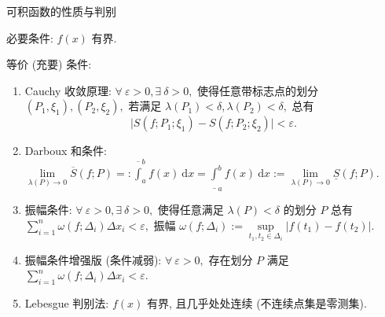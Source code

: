 \begin{frame}{可积函数的性质与判别}

必要条件: $f(x)$ 有界.

\pause
\vspace{1em}

等价 (充要) 条件:
\pause
\begin{enumerate}[<+->]
\item Cauchy 收敛原理: $\forall ~ \varepsilon > 0, \exists ~ \delta > 0,$ 使得任意带标志点的划分 $(P_1, \xi_1), (P_2, \xi_2),$ 若满足 $\lambda(P_1) < \delta, \lambda(P_2) < \delta,$ 总有
\[\lvert S(f; P_1; \xi_1) - S(f; P_2; \xi_2) \rvert < \varepsilon.\]
\item Darboux 和条件: $\lim\limits_{\lambda(P) \to 0} \overline{S}(f; P) =: \overline{\int}_a^b f(x) ~ \mathrm{d} x = \underline{\int}_a^b f(x) ~ \mathrm{d} x := \lim\limits_{\lambda(P) \to 0} \underline{S}(f; P).$
\item 振幅条件: $\forall ~ \varepsilon > 0, \exists ~ \delta > 0,$ 使得任意满足 $\lambda(P) < \delta$ 的划分 $P$ 总有
$\sum\limits_{i=1}^n \omega(f; \Delta_i) \Delta x_i < \varepsilon,$ 振幅 $\omega(f; \Delta_i) := \sup\limits_{t_1, t_2 \in \Delta_i} \lvert f(t_1) - f(t_2) \rvert.$
\item 振幅条件增强版 (条件减弱): $\forall ~ \varepsilon > 0,$ 存在划分 $P$ 满足 $\sum\limits_{i=1}^n \omega(f; \Delta_i) \Delta x_i < \varepsilon.$
\item Lebesgue 判别法: $f(x)$ 有界, 且几乎处处连续 (不连续点集是零测集).
\end{enumerate}

\end{frame}


